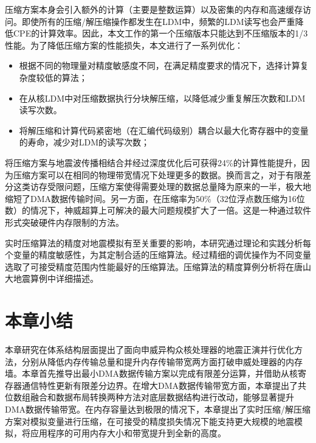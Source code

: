 压缩方案本身会引入额外的计算（主要是整数运算）以及密集的内存和高速缓存访问。即使所有的压缩/解压缩操作都发生在LDM中，频繁的LDM读写也会严重降低CPE的计算效率。因此，本文工作的第一个压缩版本只能达到不压缩版本的1/3性能。为了降低压缩方案的性能损失，本文进行了一系列优化：

\begin{itemize}
  \item 根据不同的物理量对精度敏感度不同，在满足精度要求的情况下，选择计算复杂度较低的算法；
  \item 在从核LDM中对压缩数据执行分块解压缩，以降低减少重复解压次数和LDM读写次数。
  \item 将解压缩和计算代码紧密地（在汇编代码级别）耦合以最大化寄存器中的变量的寿命，减少对LDM的读写次数；
\end{itemize}

将压缩方案与地震波传播相结合并经过深度优化后可获得24\%的计算性能提升，因为压缩方案可以在相同的物理带宽情况下处理更多的数据。换而言之，对于有限差分这类访存受限问题，压缩方案使得需要处理的数据总量降为原来的一半，极大地缩短了DMA数据传输时间。另一方面，在压缩率为50\%（32位浮点数压缩为16位数）的情况下，神威超算上可解决的最大问题规模扩大了一倍。这是一种通过软件形式突破硬件内存限制的方法。

实时压缩算法的精度对地震模拟有至关重要的影响，本研究通过理论和实践分析每个变量的精度敏感性，为其定制合适的压缩算法。经过精细的调优操作为不同变量选取了可接受精度范围内性能最好的压缩算法。压缩算法的精度算例分析将在唐山大地震算例中详细描述。

\section{本章小结}

本章研究在体系结构层面提出了面向申威异构众核处理器的地震正演并行优化方法，分别从降低内存传输总量和提升内存传输带宽两方面打破申威处理器的内存墙。本章首先推导出最小DMA数据传输方案以完成有限差分运算，并借助从核寄存器通信特性更新有限差分边界。在增大DMA数据传输带宽方面，本章提出了共位数组融合和数据布局转换两种方法对底层数据结构进行改动，能够显著提升DMA数据传输带宽。在内存容量达到极限的情况下，本章提出了实时压缩/解压缩方案对模拟变量进行压缩，在可接受的精度损失情况下能支持更大规模的地震模拟，将应用程序的可用内存大小和带宽提升到全新的高度。


